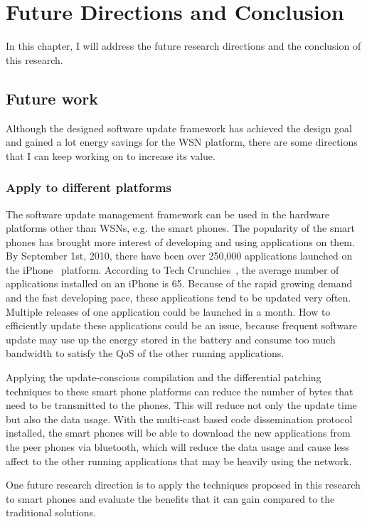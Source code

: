 \chapter{Future Directions and Conclusion }

In this chapter, I will address the future research directions and the conclusion of this research.

\section{Future work}
Although the designed software update framework has achieved the design goal and gained a lot energy savings for the WSN platform, there are some directions that I can keep working on to increase its value.

\subsection{Apply to different platforms}
The software update management framework can be used in the hardware platforms other than WSNs, e.g. the smart phones. The popularity of the smart phones has brought more interest of developing and using applications on them.
By September 1st, 2010, there have been over 250,000 applications launched on the iPhone~\cite{iphone} platform. 
According to Tech Crunchies~\cite{tech}, the average number of applications installed on an iPhone is 65. 
Because of the rapid growing demand and the fast developing pace, these applications tend to be updated very often. Multiple releases of one application could be launched in a month.
How to efficiently update these applications could be an issue, because frequent software update may use up the energy stored in the battery and consume too much bandwidth to satisfy the QoS of the other running applications. 

Applying the update-conscious compilation and the differential patching techniques to these smart phone platforms can reduce the number of bytes that need to be transmitted to the phones. This will reduce not only the update time but also the data usage. With the multi-cast based code dissemination protocol installed, the smart phones will be able to download the new applications from the peer phones via bluetooth, which will reduce the data usage and cause less affect to the other running applications that may be heavily using the network.

One future research direction is to apply the techniques proposed in this research to smart phones and evaluate the benefits that it can gain compared to the traditional solutions.

